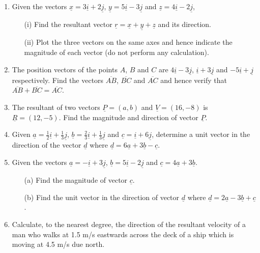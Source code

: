 \begin{enumerate}
	\item Given the vectors $\underline{x} = 3\underline{i} + 2\underline{j}$, $\underline{y} = 5\underline{i} - 3\underline{j}$ and $\underline{z} = 4\underline{i} - 2\underline{j}$,
		\begin{itemize}
		\item[(i)] Find the resultant vector $\underline{r} = \underline{x} + \underline{y} + \underline{z}$ and its direction.
		\item[(ii)] Plot the three vectors on the same axes and hence indicate the magnitude of each vector (do not perform any calculation).
		\end{itemize}
		
	\item The position vectors of the points $A$, $B$ and $C$ are $4\underline{i} - 3\underline{j}$, $\underline{i} + 3\underline{j}$ and $-5\underline{i} + \underline{j}$ respectively. Find the vectors $\overline{AB}$, $\overline{BC}$ and $\overline{AC}$ and hence verify that $\overline{AB} + \overline{BC} = \overline{AC}$.
	
	\item The resultant of two vectors $\underline{P} = (a,b)$ and $\underline{V} = (16,-8)$ is $\underline{R} = (12,-5)$. Find the magnitude and direction of vector $\underline{P}$.
	
	\item Given $\underline{a} = \frac{1}{2}\underline{i} + \frac{1}{3}\underline{j}$, $\underline{b} = \frac{2}{3}\underline{i} + \frac{1}{3}\underline{j}$ and $\underline{c} = \underline{i} + 6\underline{j}$, determine a unit vector in the direction of the vector $\underline{d}$ where $\underline{d} = 6\underline{a} + 3\underline{b} - \underline{c}$.
	
	\item Given the vectors $\underline{a} = -\underline{i} + 3\underline{j}$, $\underline{b} = 5\underline{i} - 2\underline{j}$ and $\underline{c} = 4\underline{a} + 3\underline{b}$.
		\begin{itemize}
		\item[(a)] Find the magnitude of vector $\underline{c}$.
		\item[(b)] Find the unit vector in the direction of vector $\underline{d}$ where $\underline{d} = 2\underline{a} - 3\underline{b} + \underline{c}$.
		\end{itemize}
	
	\item Calculate, to the nearest degree, the direction of the resultant velocity of a man who walks at 1.5 m\slash s eastwards across the deck of a ship which is moving at 4.5 m\slash s due north.
	

\end{enumerate}
